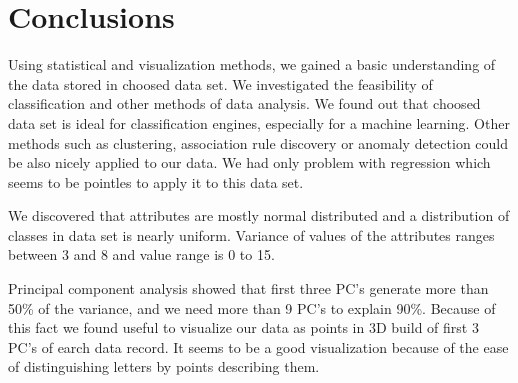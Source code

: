 \chapter*{Conclusions}
Using statistical and visualization methods, we gained a basic
understanding of the data stored in choosed data set. We investigated 
the feasibility of classification and other methods of data analysis.
We found out that choosed data set is ideal for classification engines,
especially for a machine learning. Other methods such as clustering,
association rule discovery or anomaly detection could be also nicely 
applied to our data. We had only problem with regression which seems to
be pointles to apply it to this data set. 

We discovered that attributes are mostly normal distributed and a 
distribution of classes in data set is nearly uniform. Variance of values
of the attributes ranges between 3 and 8 and value range is 0 to 15.

Principal component analysis showed that first three PC's generate more
than 50\% of the variance, and we need more than 9 PC's to explain 90\%.
Because of this fact we found useful to visualize our data as points in
3D build of first 3 PC's of earch data record. It seems to be a good 
visualization because of the ease of distinguishing letters by points
describing them.



